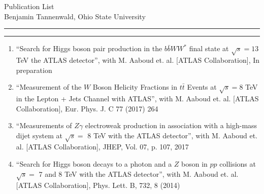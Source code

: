 \documentclass{article}
\newcommand{\soptitle}{Publication List}
\newcommand{\yourname}{Benjamin Tannenwald}
\begin{document}
\begin{center}\vspace{-2.5in}\LARGE\soptitle\\
\large \yourname, Ohio State University
\end{center}

\hrule
\vspace{1pt}
\hrule height 1pt

\bigskip
\begin{enumerate}
\item ``Search for Higgs boson pair production in the $b\bar{b}WW^*$ final state at $\sqrt{s}=13$ TeV the ATLAS detector'', with M. Aaboud et. al. [ATLAS Collaboration], In preparation\vspace{8pt} \\
\item ``Measurement of the $W$ Boson Helicity Fractions in $t\bar{t}$ Events at $\sqrt{s}=8$ TeV in the Lepton + Jets Channel with ATLAS'', with M. Aaboud et. al. [ATLAS Collaboration], Eur. Phys. J. C 77 (2017) 264\vspace{8pt} \\
\item ``Measurements of $Z\gamma$ electroweak production in association with a high-mass dijet system at $\sqrt{s}=$ 8 TeV with the ATLAS detector'', with M. Aaboud et. al. [ATLAS Collaboration], JHEP, Vol. 07, p. 107, 2017\vspace{8pt} \\
\item ``Search for Higgs boson decays to a photon and a $Z$ boson in $pp$ collisions at $\sqrt{s}=$ 7 and 8 TeV with the ATLAS detector'', with M. Aaboud et. al. [ATLAS Collaboration], Phys. Lett. B, 732, 8 (2014)\
\end{enumerate}
\end{document}
